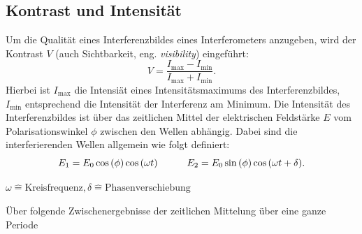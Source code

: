 \FloatBarrier
\subsection{Kontrast und Intensität}
Um die Qualität eines Interferenzbildes eines Interferometers anzugeben, wird der Kontrast $V$ (auch Sichtbarkeit, eng. \textit{visibility}) eingeführt:
\begin{equation}
	V = \frac{I_{\text{max}} - I_{\text{min}}} {I_{\text{max}} + I_{\text{min}}}.
	\label{eqn:kontrastohnewinkel}
\end{equation}
Hierbei ist $I_{\text{max}}$ die Intensiät eines Intensitätsmaximums des Interferenzbildes, $I_{\text{min}}$ entsprechend die Intensität der Interferenz am Minimum.
Die Intensität des Interferenzbildes ist über das zeitlichen Mittel der elektrischen Feldstärke $E$ vom Polarisationswinkel $\phi$ zwischen den Wellen abhängig.
Dabei sind die interferierenden Wellen allgemein wie folgt definiert:
\begin{equation*}
	E_{1} =  E_{0} \cos{\left( \phi \right)} \cos{ \left( \omega t \right) } 			\quad \quad \quad
	E_{2} =  E_{0} \sin{\left( \phi \right)} \cos{ \left( \omega t + \delta \right) }. 	\\
\end{equation*}
\begin{center}
	\tiny{$\omega \widehat{=} \text{Kreisfrequenz}, \delta \widehat{=} \text{Phasenverschiebung} $}
\end{center}
Über folgende Zwischenergebnisse der zeitlichen Mittelung über eine ganze Periode
